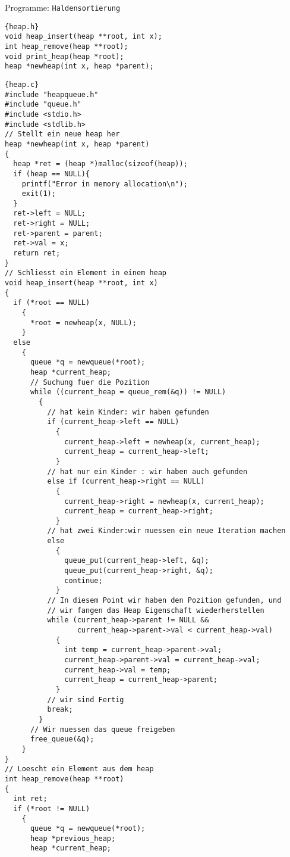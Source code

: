 \begin{myexampleprogram}{Programme: \texttt{Haldensortierung}}
\begin{lstlisting}{heap.h}
void heap_insert(heap **root, int x);
int heap_remove(heap **root);
void print_heap(heap *root);
heap *newheap(int x, heap *parent);
\end{lstlisting}
\begin{lstlisting}{heap.c}
#include "heapqueue.h"
#include "queue.h"
#include <stdio.h>
#include <stdlib.h>
// Stellt ein neue heap her
heap *newheap(int x, heap *parent)
{
  heap *ret = (heap *)malloc(sizeof(heap));
  if (heap == NULL){
    printf("Error in memory allocation\n");
    exit(1);
  }
  ret->left = NULL;
  ret->right = NULL;
  ret->parent = parent;
  ret->val = x;
  return ret;
}
// Schliesst ein Element in einem heap
void heap_insert(heap **root, int x)
{
  if (*root == NULL)
    {
      *root = newheap(x, NULL);
    }
  else
    {
      queue *q = newqueue(*root);
      heap *current_heap;
      // Suchung fuer die Pozition
      while ((current_heap = queue_rem(&q)) != NULL)
        {
          // hat kein Kinder: wir haben gefunden
          if (current_heap->left == NULL)
            {
              current_heap->left = newheap(x, current_heap);
              current_heap = current_heap->left;
            }
          // hat nur ein Kinder : wir haben auch gefunden
          else if (current_heap->right == NULL)
            {
              current_heap->right = newheap(x, current_heap);
              current_heap = current_heap->right;
            }
          // hat zwei Kinder:wir muessen ein neue Iteration machen
          else
            {
              queue_put(current_heap->left, &q);
              queue_put(current_heap->right, &q);
              continue;
            }
          // In diesem Point wir haben den Pozition gefunden, und
          // wir fangen das Heap Eigenschaft wiederherstellen
          while (current_heap->parent != NULL &&
                 current_heap->parent->val < current_heap->val)
            {
              int temp = current_heap->parent->val;
              current_heap->parent->val = current_heap->val;
              current_heap->val = temp;
              current_heap = current_heap->parent;
            }
          // wir sind Fertig
          break;
        }
      // Wir muessen das queue freigeben
      free_queue(&q);
    }
}
// Loescht ein Element aus dem heap
int heap_remove(heap **root)
{
  int ret;
  if (*root != NULL)
    {
      queue *q = newqueue(*root);
      heap *previous_heap;
      heap *current_heap;

\end{lstlisting}
\end{myexampleprogram}
